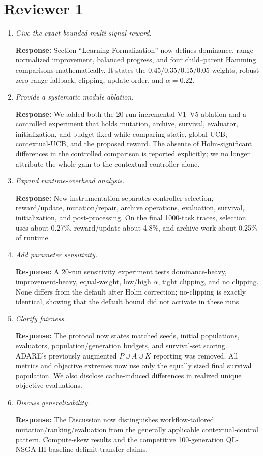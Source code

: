 \documentclass[11pt]{article}
\newcommand{\response}[1]{\par\smallskip\noindent\textcolor{blue!55!black}{\textbf{Response:} #1}\par\medskip}
\begin{document}
\section*{Reviewer 1}
\begin{enumerate}
\item \emph{Give the exact bounded multi-signal reward.}
\response{Section ``Learning Formalization'' now defines dominance, range-normalized improvement, balanced progress, and four child--parent Hamming comparisons mathematically. It states the 0.45/0.35/0.15/0.05 weights, robust zero-range fallback, clipping, update order, and $\alpha=0.22$.}

\item \emph{Provide a systematic module ablation.}
\response{We added both the 20-run incremental V1--V5 ablation and a controlled experiment that holds mutation, archive, survival, evaluator, initialization, and budget fixed while comparing static, global-UCB, contextual-UCB, and the proposed reward. The absence of Holm-significant differences in the controlled comparison is reported explicitly; we no longer attribute the whole gain to the contextual controller alone.}

\item \emph{Expand runtime-overhead analysis.}
\response{New instrumentation separates controller selection, reward/update, mutation/repair, archive operations, evaluation, survival, initialization, and post-processing. On the final 1000-task traces, selection uses about 0.27\%, reward/update about 4.8\%, and archive work about 0.25\% of runtime.}

\item \emph{Add parameter sensitivity.}
\response{A 20-run sensitivity experiment tests dominance-heavy, improvement-heavy, equal-weight, low/high $\alpha$, tight clipping, and no clipping. None differs from the default after Holm correction; no-clipping is exactly identical, showing that the default bound did not activate in these runs.}

\item \emph{Clarify fairness.}
\response{The protocol now states matched seeds, initial populations, evaluators, population/generation budgets, and survival-set scoring. ADARE's previously augmented $P\cup A\cup K$ reporting was removed. All metrics and objective extremes now use only the equally sized final survival population. We also disclose cache-induced differences in realized unique objective evaluations.}

\item \emph{Discuss generalizability.}
\response{The Discussion now distinguishes workflow-tailored mutation/ranking/evaluation from the generally applicable contextual-control pattern. Compute-skew results and the competitive 100-generation QL-NSGA-III baseline delimit transfer claims.}


\end{enumerate}
\end{document}
